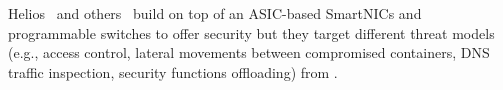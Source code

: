 Helios~\cite{10.1145/3620678.3624786} and others~\cite{10.1145/3563647.3563654, 10.1145/3321408.3323087} build on top of an ASIC-based SmartNICs and programmable switches to offer security but they target different threat models (e.g., access control, lateral movements between compromised containers, DNS traffic inspection, security functions offloading) from \projecttitle{}.







